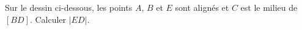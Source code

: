 %
%
    Sur le dessin ci-dessous, les points $A$, $B$ et $E$ sont alignés et $C$ est le milieu de $[BD]$. Calculer $\left| ED \right|$.
    \begin{center}
        
    \end{center}

